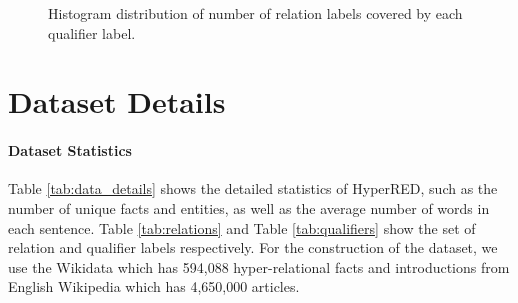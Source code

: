 \documentclass[11pt]{article}
\newcommand{\dataname}{HyperRED}
\begin{document}
\begin{figure}[t!]
\centering
{}
\caption{
Histogram distribution of number of relation labels covered by each qualifier label.
}
\label{fig:qualifier_dist}
\end{figure}

\section{Dataset Details}
\label{sec:data_details}
\paragraph{Dataset Statistics}
Table \ref{tab:data_details} shows the detailed statistics of \dataname{}, such as the number of unique facts and entities, as well as the average number of words in each sentence. 
Table \ref{tab:relations} and Table \ref{tab:qualifiers} show the set of relation and qualifier labels respectively.
For the construction of the dataset, we use the Wikidata which has 594,088 hyper-relational facts and introductions from English Wikipedia which has 4,650,000 articles.
\end{document}
